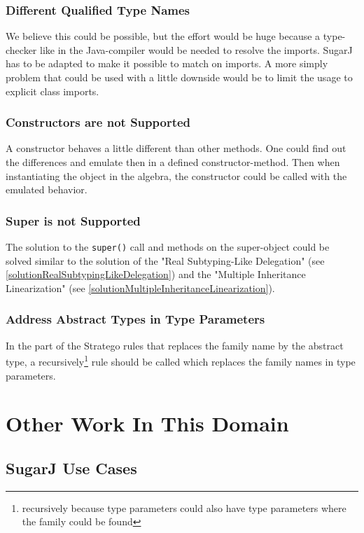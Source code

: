 \documentclass{report}
\begin{document}
\subsection{Different Qualified Type Names}

We believe this could be possible, but the effort would be huge because a type-checker like in the Java-compiler would be needed to resolve the imports. SugarJ has to be adapted to make it possible to match on imports. A more simply problem that could be used with a little downside would be to limit the usage to explicit class imports.

\subsection{Constructors are not Supported}

A constructor behaves a little different than other methods. One could find out the differences and emulate then in a defined constructor-method. Then when instantiating the object in the algebra, the constructor could be called with the emulated behavior.

\subsection{Super is not Supported}

The solution to the \lstinline{super()} call and methods on the super-object could be solved similar to the solution of the "Real Subtyping-Like Delegation" (see \ref{solutionRealSubtypingLikeDelegation}) and the "Multiple Inheritance Linearization" (see \ref{solutionMultipleInheritanceLinearization}).

\subsection{Address Abstract Types in Type Parameters}

In the part of the Stratego rules that replaces the family name by the abstract type, a recursively\footnote{recursively because type parameters could also have type parameters where the family could be found} rule should be called which replaces the family names in type parameters.

\chapter{Other Work In This Domain}

\section{SugarJ \cite{Erdweg-SugarJ-2011} Use Cases}
\end{document}
